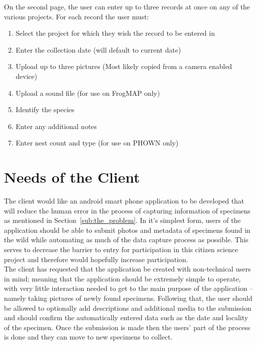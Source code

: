 \documentclass[
10pt, %
a4paper, %
oneside, %
headinclude,footinclude, %
BCOR5mm, %
]{scrartcl}
\begin{document}
On the second page, the user can enter up to three records at once on any of the various projects. For each record the user must:

\begin{enumerate}
\item Select the project for which they wish the record to be entered in
\item Enter the collection date (will default to current date)
\item Upload up to three pictures (Most likely copied from a camera enabled device)
\item Upload a sound file (for use on FrogMAP only)
\item Identify the species
\item Enter any additional notes
\item Enter nest count and type (for use on PHOWN only)
\end{enumerate}


\section{Needs of the Client} %
\label{sec:needs_of_the_client}

The client would like an android smart phone application to be developed that will reduce the human error in the process of capturing information of specimens as mentioned in Section~\vref{sub:the_problem}. In it's simplest form, users of the application should be able to submit photos and metadata of specimens found in the wild while automating as much of the data capture process as possible. This serves to decrease the barrier to entry for participation in this citizen science project and therefore would hopefully increase participation. \\

\noindent
The client has requested that the application be created with non-technical users in mind; meaning that the application should be extremely simple to operate, with very little interaction needed to get to the main purpose of the application -- namely taking pictures of newly found specimens. Following that, the user should be allowed to optionally add descriptions and additional media to the submission and should confirm the automatically entered data such as the date and locality of the specimen. Once the submission is made then the users' part of the process is done and they can move to new specimens to collect. 
\end{document}
